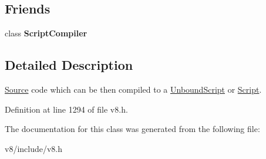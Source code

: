 \subsection*{Friends}
\begin{DoxyCompactItemize}
\item 
\mbox{\label{classv8_1_1ScriptCompiler_1_1Source_a1cb50af99960b4c11eaee7347e034f51}} 
class {\bfseries Script\+Compiler}
\end{DoxyCompactItemize}


\subsection{Detailed Description}
\mbox{\hyperlink{classv8_1_1ScriptCompiler_1_1Source}{Source}} code which can be then compiled to a \mbox{\hyperlink{classv8_1_1UnboundScript}{Unbound\+Script}} or \mbox{\hyperlink{classv8_1_1Script}{Script}}. 

Definition at line 1294 of file v8.\+h.



The documentation for this class was generated from the following file\+:\begin{DoxyCompactItemize}
\item 
v8/include/v8.\+h\end{DoxyCompactItemize}
